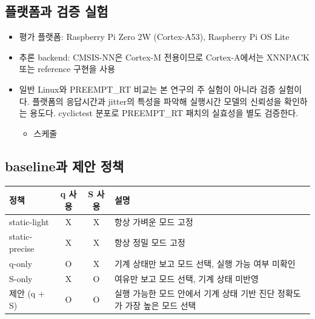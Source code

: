 \documentclass[10pt]{article}
\begin{document}
\subsection{플랫폼과 검증 실험}
\begin{itemize}
\item 평가 플랫폼: Raspberry Pi Zero 2W (Cortex-A53), Raspberry Pi OS Lite
\item 추론 backend: CMSIS-NN은 Cortex-M 전용이므로 Cortex-A에서는 XNNPACK 또는 reference 구현을 사용
\item 일반 Linux와 PREEMPT\_RT 비교는 본 연구의 주 실험이 아니라 검증 실험이다. 플랫폼의 응답시간과 jitter의 특성을 파악해 실행시간 모델의 신뢰성을 확인하는 용도다. cyclictest 분포로 PREEMPT\_RT 패치의 실효성을 별도 검증한다.
\begin{itemize}
\item 스케줄
\end{itemize}
\end{itemize}

\subsection{baseline과 제안 정책}
\begin{center}\footnotesize
\begin{tabular}{@{}lccL{6.5cm}@{}}
\toprule
정책 & q 사용 & S 사용 & 설명 \\ \midrule
static-light & X & X & 항상 가벼운 모드 고정 \\
static-precise & X & X & 항상 정밀 모드 고정 \\
q-only & O & X & 기계 상태만 보고 모드 선택, 실행 가능 여부 미확인 \\
S-only & X & O & 여유만 보고 모드 선택, 기계 상태 미반영 \\
제안 (q + S) & O & O & 실행 가능한 모드 안에서 기계 상태 기반 진단 정확도가 가장 높은 모드 선택 \\
\bottomrule
\end{tabular}
\end{center}
\end{document}
